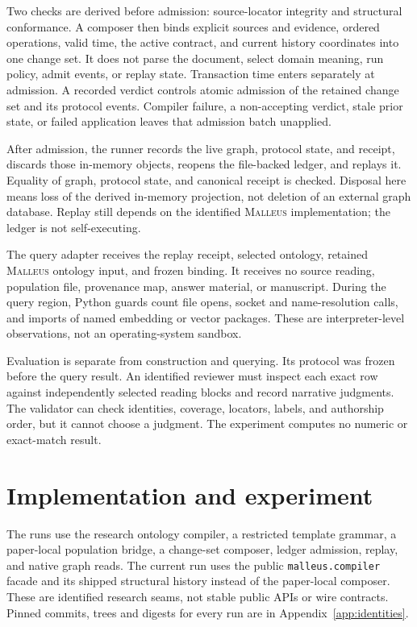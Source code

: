 \documentclass[10pt]{article}
\newcommand{\malleus}{\textsc{Malleus}}
\newcommand{\code}[1]{\texttt{#1}}
\begin{document}
Two checks are derived before admission: source-locator integrity and structural conformance. A composer then binds explicit sources and evidence, ordered operations, valid time, the active contract, and current history coordinates into one change set. It does not parse the document, select domain meaning, run policy, admit events, or replay state. Transaction time enters separately at admission. A recorded verdict controls atomic admission of the retained change set and its protocol events. Compiler failure, a non-accepting verdict, stale prior state, or failed application leaves that admission batch unapplied.

After admission, the runner records the live graph, protocol state, and receipt, discards those in-memory objects, reopens the file-backed ledger, and replays it. Equality of graph, protocol state, and canonical receipt is checked. Disposal here means loss of the derived in-memory projection, not deletion of an external graph database. Replay still depends on the identified \malleus{} implementation; the ledger is not self-executing.

The query adapter receives the replay receipt, selected ontology, retained \malleus{} ontology input, and frozen binding. It receives no source reading, population file, provenance map, answer material, or manuscript. During the query region, Python guards count file opens, socket and name-resolution calls, and imports of named embedding or vector packages. These are interpreter-level observations, not an operating-system sandbox.

Evaluation is separate from construction and querying. Its protocol was frozen before the query result. An identified reviewer must inspect each exact row against independently selected reading blocks and record narrative judgments. The validator can check identities, coverage, locators, labels, and authorship order, but it cannot choose a judgment. The experiment computes no numeric or exact-match result.

\section{Implementation and experiment}

The runs use the research ontology compiler, a restricted template grammar, a paper-local population bridge, a change-set composer, ledger admission, replay, and native graph reads. The current run uses the public \code{malleus.compiler} facade and its shipped structural history instead of the paper-local composer. These are identified research seams, not stable public APIs or wire contracts. Pinned commits, trees and digests for every run are in Appendix~\ref{app:identities}.
\end{document}
